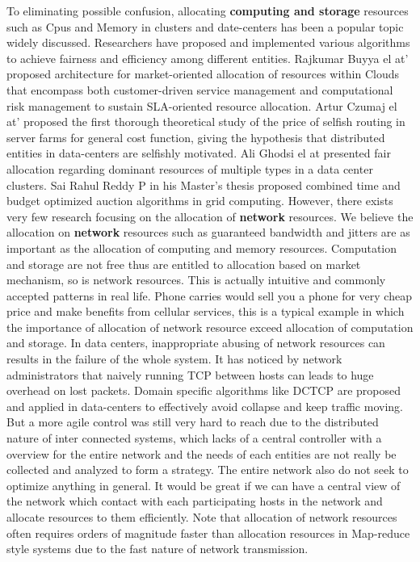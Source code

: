 \documentclass[a4paper,11pt,twocolumn]{article}
\begin{document}
To eliminating possible confusion, allocating \textbf{computing and storage} resources such as Cpus and Memory
 in clusters and date-centers has been a popular topic widely discussed. Researchers have proposed and implemented
various algorithms to achieve fairness and efficiency among different entities. 
Rajkumar Buyya el at' \cite{Rajkumar} proposed architecture for market-oriented allocation of 
resources within Clouds that encompass both customer-driven service management 
and computational risk management to sustain SLA-oriented resource allocation. 
Artur   Czumaj el at'\cite{Artur} proposed  the first thorough theoretical study of the
price of selfish routing in server farms for general cost function, giving the hypothesis that 
distributed entities in data-centers are selfishly motivated.  
Ali Ghodsi el at\cite{Ali} presented fair allocation regarding dominant resources of multiple types
in a data center clusters.
Sai Rahul Reddy P\cite{Sai} in his Master's thesis proposed combined time and budget optimized auction 
algorithms in grid computing. 
However, there exists very few research focusing on the allocation
of \textbf{network} resources. We believe the allocation on \textbf{network} resources such as guaranteed bandwidth and 
jitters are as important as the allocation of computing and memory resources. Computation and storage are not free
thus are entitled to allocation based on market mechanism, so is network resources. This is actually intuitive 
and commonly accepted patterns in real life. Phone carries would sell you a phone for very cheap price and make 
benefits from cellular services, this is a typical example in which the importance of allocation of network resource
 exceed allocation of computation and storage. In data centers, inappropriate abusing of network resources can results
in the failure of the whole system. It has noticed by network administrators that naively running TCP
between hosts can leads to huge overhead on lost packets. Domain specific algorithms like DCTCP\cite{Mohammad} are proposed and applied
in data-centers to effectively avoid collapse and keep traffic moving. But a more agile control was still very hard
to reach due to the distributed nature of inter connected systems, which lacks of a central controller with
a overview for the entire network and the needs of each entities are not really be collected and analyzed to form a strategy. The entire network also do not seek to optimize anything in general.
It would be great if we can have a central view of the network which contact with each participating hosts in the network and allocate resources to them efficiently. Note that
allocation of network resources often requires orders of  magnitude faster than allocation resources in Map-reduce style 
systems due to the fast nature of network transmission.     
\end{document}
